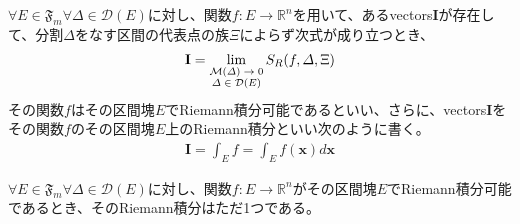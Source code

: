 \documentclass[dvipdfmx]{jsarticle}
\begin{document}
\begin{dfn}
$\forall E \in \mathfrak{F}_{m}\forall\varDelta \in \mathcal{D}(E)$に対し、関数$f:E \rightarrow \mathbb{R}^{n}$を用いて、あるvectors$\mathbf{I}$が存在して、分割$\varDelta$をなす区間の代表点の族$\Xi$によらず次式が成り立つとき、
\begin{align*}
\mathbf{I} = \lim_{\scriptsize \begin{matrix}
\mathcal{M}(\varDelta) \rightarrow 0 \\
\varDelta \in \mathcal{D}(E) \\
\end{matrix}}{S_{R}(f,\varDelta,\Xi)}
\end{align*}
その関数$f$はその区間塊$E$でRiemann積分可能であるといい、さらに、vectors$\mathbf{I}$をその関数$f$のその区間塊$E$上のRiemann積分といい次のように書く。
\begin{align*}
\mathbf{I} = \int_{E} f = \int_{E} {f\left( \mathbf{x} \right)d\mathbf{x}}
\end{align*}
\end{dfn}
\begin{thm}\label{4.6.5.6}
$\forall E \in \mathfrak{F}_{m}\forall\varDelta \in \mathcal{D}(E)$に対し、関数$f:E \rightarrow \mathbb{R}^{n}$がその区間塊$E$でRiemann積分可能であるとき、そのRiemann積分はただ1つである。
\end{thm}
\end{document}
